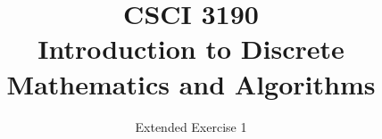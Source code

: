 \documentclass{../../cls/sig-alternate-05-2015}
\begin{document}






%

\title{CSCI 3190 \\ Introduction to Discrete Mathematics and Algorithms}
\subtitle{Extended Exercise 1}

\maketitle
\begin{abstract}

\end{abstract}

\keywords{}
\end{document}

